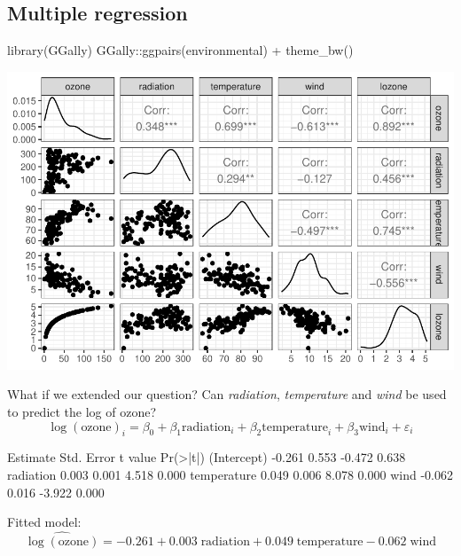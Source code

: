 \documentclass[a4paper]{article}\usepackage[]{graphicx}\usepackage[]{xcolor}
\makeatletter
\def\maxwidth{ %
  \ifdim\Gin@nat@width>\linewidth
    \linewidth
  \else
    \Gin@nat@width
  \fi
}
\makeatother
\begin{document}
\subsection{Multiple regression}
\begin{Schunk}
\begin{Sinput}
library(GGally)
GGally::ggpairs(environmental) + theme_bw()
\end{Sinput}


{\centering \includegraphics[width=\maxwidth]{figure/listings-unnamed-chunk-361-1} 

}

\end{Schunk}
What if we extended our question? Can \textit{radiation}, \textit{temperature} and \textit{wind} be used to predict the log of ozone?
\[
	\log(\text{ozone})_i = \beta_0 + \beta_1 \text{radiation}_i + \beta_2 \text{temperature}_i + \beta_3 \text{wind}_i + \varepsilon_i
\]
\begin{Schunk}
\begin{Soutput}
            Estimate Std. Error t value Pr(>|t|)
(Intercept)   -0.261      0.553  -0.472    0.638
radiation      0.003      0.001   4.518    0.000
temperature    0.049      0.006   8.078    0.000
wind          -0.062      0.016  -3.922    0.000
\end{Soutput}
\end{Schunk}
Fitted model:
\[
	\widehat{\log(\text{ozone})} = -0.261 + 0.003\; \text{radiation} + 0.049\; \text{temperature} - 0.062\; \text{wind}
\]
\end{document}
